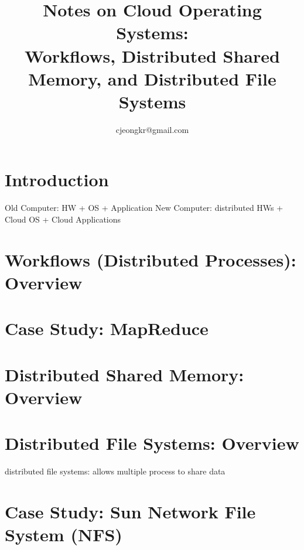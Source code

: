 \documentclass{note}
\begin{document}
\title{\Large\bf{}Notes on Cloud Operating Systems:\\  Workflows, Distributed
  Shared Memory, and Distributed File Systems}
\author{\normalsize{}cjeongkr@gmail.com}
\date{}
\maketitle

\small

\section{Introduction}
\bit
\w Old Computer: HW + OS + Application
\w New Computer: distributed HWs + Cloud OS + Cloud Applications
\eit

%
\section{Workflows (Distributed Processes): Overview}
\section{Case Study: MapReduce}

% 
\section{Distributed Shared Memory: Overview}


%
\section{Distributed File Systems: Overview}
\bit
\w distributed file systems:
   \bit
   \w allows multiple process to share data
   \eit
\eit

%
%
%
\section{Case Study: Sun Network File System (NFS)}
\end{document}
